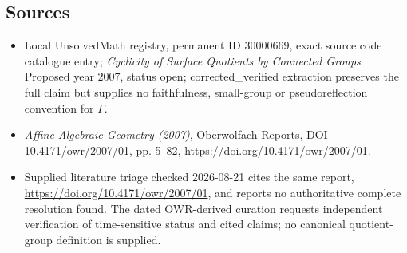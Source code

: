 \documentclass[11pt]{article}
\begin{document}
\subsection{Sources}
\begin{itemize}
\item Local UnsolvedMath registry, permanent ID 30000669, exact source code catalogue entry; \emph{Cyclicity of Surface Quotients by Connected Groups}. Proposed year 2007, status open; corrected\_verified extraction preserves the full claim but supplies no faithfulness, small-group or pseudoreflection convention for $\Gamma$.
\item \emph{Affine Algebraic Geometry (2007)}, Oberwolfach Reports, DOI 10.4171/owr/2007/01, pp. 5--82, \url{https://doi.org/10.4171/owr/2007/01}.
\item Supplied literature triage checked 2026-08-21 cites the same report, \url{https://doi.org/10.4171/owr/2007/01}, and reports no authoritative complete resolution found. The dated OWR-derived curation requests independent verification of time-sensitive status and cited claims; no canonical quotient-group definition is supplied.
\end{itemize}
\end{document}
